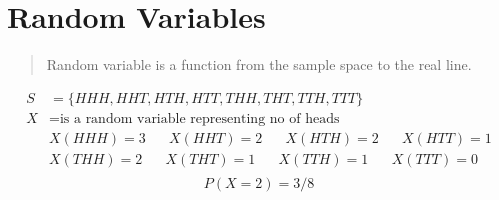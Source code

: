\section{Random Variables}
\begin{slide}
  \begin{quote}
  Random variable is a function from the sample space to the real line.
  \end{quote}
  \begin{align*}
    S &= \{HHH, HHT, HTH , HTT, THH, THT, TTH,  TTT\}\\
    X &= \text{is a random variable representing no of heads}\\
    &X(HHH) = 3\hspace{20pt} 
    X(HHT) = 2 \hspace{20pt}
    X(HTH) = 2\hspace{20pt}
    X(HTT) = 1\\
    &X(THH) = 2\hspace{20pt}
    X(THT) = 1\hspace{20pt}
    X(TTH) = 1\hspace{20pt}
    X(TTT) = 0\\
   \end{align*}
     $$P(X=2) = 3/8$$
\end{slide}
